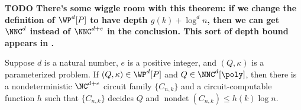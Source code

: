 \documentclass{article}
\newcommand{\todo}[1]{\textbf{TODO #1}}
\DeclareMathOperator{\nondet}{nondet}
\begin{document}
\todo{
  There's some wiggle room with this theorem: if we change the definition of $\WP^d[P]$ to have depth $g(k) + \log^d n$, then we can get $\NNC^d$ instead of $\NNC^{d + e}$ in the conclusion.
  This sort of depth bound appears in \autocite{bst15}.
}

\begin{theorem}\label{thm:rmparam}
  Suppose $d$ is a natural number, $e$ is a positive integer, and $(Q, \kappa)$ is a parameterized problem.
  If $(Q, \kappa) \in \WP^d[P]$ and $Q \in \NNC^d[\poly]$, then there is a nondeterministic $\NC^{d + e}$ circuit family $\{C_{n, k}\}$ and a circuit-computable function $h$ such that $\{C_{n, k}\}$ decides $Q$ and $\nondet(C_{n, k}) \leq h(k) \log n$.
\end{theorem}
\end{document}
